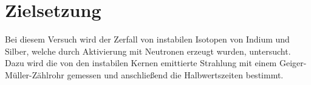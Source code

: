 \section{Zielsetzung}
\label{sec:Zielsetzung}
Bei diesem Versuch wird der Zerfall von instabilen Isotopen von Indium und Silber, welche durch Aktivierung mit Neutronen erzeugt wurden, untersucht.
Dazu wird die von den instabilen Kernen emittierte Strahlung mit einem Geiger-Müller-Zählrohr gemessen und anschließend die Halbwertszeiten bestimmt.
